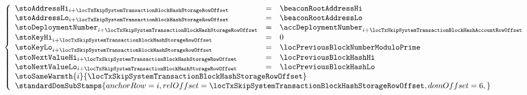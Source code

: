 \item[\underline{Storing the previous \inst{BLOCKHASH} in the state:}] 
	\[
		\left\{ \begin{array}{lclr}
			\stoAddressHi         _{i + \locTxSkipSystemTransactionBlockHashStorageRowOffset}  & = & \beaconRootAddressHi                                                             \\
			\stoAddressLo         _{i + \locTxSkipSystemTransactionBlockHashStorageRowOffset}  & = & \beaconRootAddressLo                                                             \\
			\stoDeploymentNumber  _{i + \locTxSkipSystemTransactionBlockHashStorageRowOffset}  & = & \accDeploymentNumber _{i + \locTxSkipSystemTransactionBlockHashAccountRowOffset} \\
			\stoKeyHi             _{i + \locTxSkipSystemTransactionBlockHashStorageRowOffset}  & = & 0                                                                                \\
			\stoKeyLo             _{i + \locTxSkipSystemTransactionBlockHashStorageRowOffset}  & = & \locPreviousBlockNumberModuloPrime                                               \\
			\stoNextValueHi       _{i + \locTxSkipSystemTransactionBlockHashStorageRowOffset}  & = & \locPreviousBlockHashHi                                               \\
			\stoNextValueLo       _{i + \locTxSkipSystemTransactionBlockHashStorageRowOffset}  & = & \locPreviousBlockHashLo                                               \\
			\multicolumn{3}{l}{\stoSameWarmth  {i}{\locTxSkipSystemTransactionBlockHashStorageRowOffset} } \\
			\multicolumn{3}{l}{
				\standardDomSubStamps {
					anchorRow = i                                                     ,
					relOffset = \locTxSkipSystemTransactionBlockHashStorageRowOffset ,
					domOffset = 6                                                     ,
				}} \\
		\end{array} \right.
	\]
